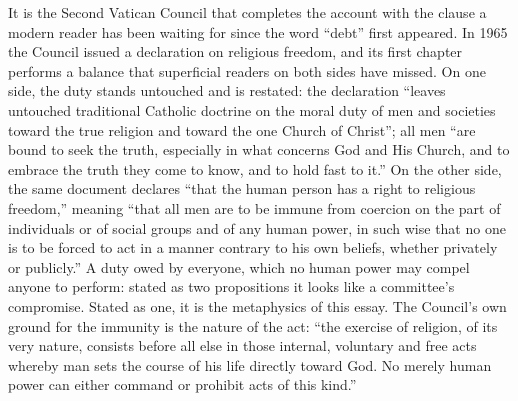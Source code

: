 It is the Second Vatican Council that completes the account with the clause a modern reader has been waiting for since the word ``debt'' first appeared. In 1965 the Council issued a declaration on religious freedom, and its first chapter performs a balance that superficial readers on both sides have missed. On one side, the duty stands untouched and is restated: the declaration ``leaves untouched traditional Catholic doctrine on the moral duty of men and societies toward the true religion and toward the one Church of Christ''; all men ``are bound to seek the truth, especially in what concerns God and His Church, and to embrace the truth they come to know, and to hold fast to it.'' On the other side, the same document declares ``that the human person has a right to religious freedom,'' meaning ``that all men are to be immune from coercion on the part of individuals or of social groups and of any human power, in such wise that no one is to be forced to act in a manner contrary to his own beliefs, whether privately or publicly.'' A duty owed by everyone, which no human power may compel anyone to perform: stated as two propositions it looks like a committee's compromise. Stated as one, it is the metaphysics of this essay. The Council's own ground for the immunity is the nature of the act: ``the exercise of religion, of its very nature, consists before all else in those internal, voluntary and free acts whereby man sets the course of his life directly toward God. No merely human power can either command or prohibit acts of this kind.''

